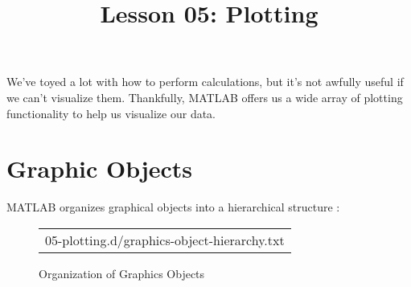 \documentclass{article}
\title{Lesson 05: Plotting}
\begin{document}
\renderTitle

We've toyed a lot with how to perform calculations, but it's not awfully
useful if we can't visualize them.  Thankfully, MATLAB offers us a wide
array of plotting functionality to help us visualize our data.

\section{Graphic Objects}

MATLAB organizes graphical objects into a hierarchical structure%
:

\begin{figure}[!ht]
\Centering
\small
\begin{tabular}{c}
	{05-plotting.d/graphics-object-hierarchy.txt}
\end{tabular}
\caption{Organization of Graphics Objects}
\end{figure}
\end{document}
